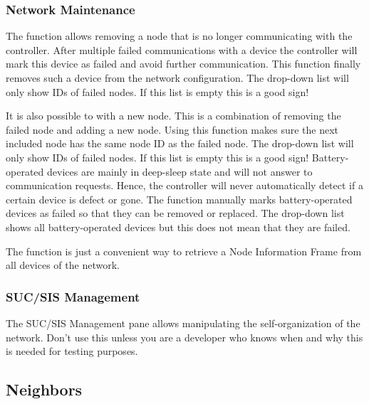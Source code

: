 \subsubsection{Network Maintenance}

The function  allows removing a node that is no longer communicating 
with the controller. After multiple failed communications with a device the controller 
will mark this device as failed and avoid further communication. This function finally 
removes such a device from the network configuration. The drop-down list will only show 
IDs of failed nodes. If this list is empty this is a good sign!

It is also possible to  with a new node. This is a combination 
of removing the failed node and adding a new node. Using this function makes sure the next 
included node has the same node ID as the failed node. The drop-down list will only show 
IDs of failed nodes. If this list is empty this is a good sign! Battery-operated devices 
are mainly in deep-sleep state and will not answer to communication requests. Hence, the 
controller will never automatically detect if a certain device is defect or gone. The 
function  manually marks battery-operated devices as 
failed so that they can be removed or replaced. The drop-down list shows all battery-operated 
devices but this does not mean that they are failed.

The  function is just a convenient way to retrieve a Node 
Information Frame from all devices of the network.

\subsubsection{SUC/SIS Management}

The SUC/SIS Management pane allows manipulating the self-organization of the \zwave network. 
Don’t use this unless you are a developer who knows when and why this is needed for testing purposes.

\subsection{Neighbors}


